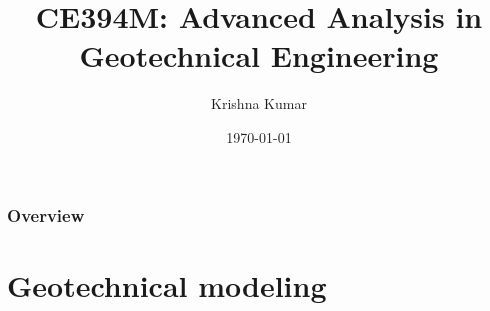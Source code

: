 \documentclass[beamer]{beamer}
\title[CE394M: Geotechnical modeling]{CE394M: Advanced Analysis in Geotechnical Engineering}
\author{Krishna Kumar} %
\institute[UT Austin] %
{
University of Texas at Austin \\
\medskip
\textit{
  \url{krishnak@utexas.edu}} %
}
\date{\today} %
\begin{document}
\begin{frame}
\titlepage %
\end{frame}

\begin{frame}
 \frametitle{Overview}
 \tableofcontents
\end{frame}


\section{Geotechnical modeling}
\end{document}
